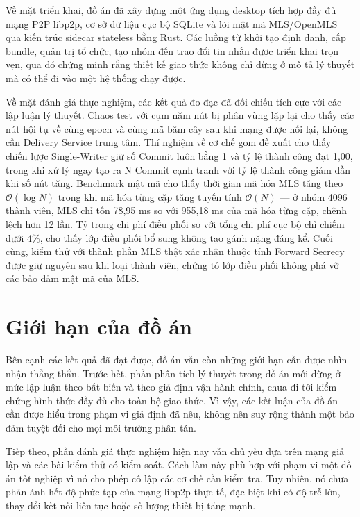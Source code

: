 \documentclass[../DoAn.tex]{subfiles}
\begin{document}
Về mặt triển khai, đồ án đã xây dựng một ứng dụng desktop tích hợp đầy đủ mạng P2P libp2p, cơ sở dữ liệu cục bộ SQLite và lõi mật mã MLS/OpenMLS qua kiến trúc sidecar stateless bằng Rust. Các luồng từ khởi tạo định danh, cấp bundle, quản trị tổ chức, tạo nhóm đến trao đổi tin nhắn được triển khai trọn vẹn, qua đó chứng minh rằng thiết kế giao thức không chỉ dừng ở mô tả lý thuyết mà có thể đi vào một hệ thống chạy được.

Về mặt đánh giá thực nghiệm, các kết quả đo đạc đã đối chiếu tích cực với các lập luận lý thuyết. Chaos test với cụm năm nút bị phân vùng lặp lại cho thấy các nút hội tụ về cùng epoch và cùng mã băm cây sau khi mạng được nối lại, không cần Delivery Service trung tâm. Thí nghiệm về cơ chế gom đề xuất cho thấy chiến lược Single-Writer giữ số Commit luôn bằng 1 và tỷ lệ thành công đạt 1,00, trong khi xử lý ngay tạo ra N Commit cạnh tranh với tỷ lệ thành công giảm dần khi số nút tăng. Benchmark mật mã cho thấy thời gian mã hóa MLS tăng theo $\mathcal{O}(\log N)$ trong khi mã hóa từng cặp tăng tuyến tính $\mathcal{O}(N)$ --- ở nhóm 4096 thành viên, MLS chỉ tốn 78,95 ms so với 955,18 ms của mã hóa từng cặp, chênh lệch hơn 12 lần. Tỷ trọng chi phí điều phối so với tổng chi phí cục bộ chỉ chiếm dưới 4\%, cho thấy lớp điều phối bổ sung không tạo gánh nặng đáng kể. Cuối cùng, kiểm thử với thành phần MLS thật xác nhận thuộc tính Forward Secrecy được giữ nguyên sau khi loại thành viên, chứng tỏ lớp điều phối không phá vỡ các bảo đảm mật mã của MLS.

\section{Giới hạn của đồ án}

Bên cạnh các kết quả đã đạt được, đồ án vẫn còn những giới hạn cần được nhìn nhận thẳng thắn. Trước hết, phần phân tích lý thuyết trong đồ án mới dừng ở mức lập luận theo bất biến và theo giả định vận hành chính, chưa đi tới kiểm chứng hình thức đầy đủ cho toàn bộ giao thức. Vì vậy, các kết luận của đồ án cần được hiểu trong phạm vi giả định đã nêu, không nên suy rộng thành một bảo đảm tuyệt đối cho mọi môi trường phân tán.

Tiếp theo, phần đánh giá thực nghiệm hiện nay vẫn chủ yếu dựa trên mạng giả lập và các bài kiểm thử có kiểm soát. Cách làm này phù hợp với phạm vi một đồ án tốt nghiệp vì nó cho phép cô lập các cơ chế cần kiểm tra. Tuy nhiên, nó chưa phản ánh hết độ phức tạp của mạng libp2p thực tế, đặc biệt khi có độ trễ lớn, thay đổi kết nối liên tục hoặc số lượng thiết bị tăng mạnh.
\end{document}
